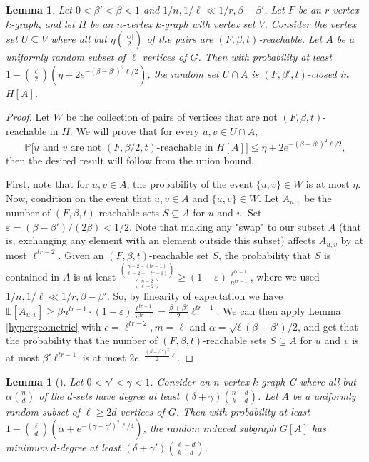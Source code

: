 \documentclass[11pt, letterpaper]{amsart}
\theoremstyle{plain}
\numberwithin{equation}{section}
\newtheorem{lemma}[thm]{Lemma}
\theoremstyle{definition}
\newcommand\card[1]{\left| #1 \right|}
\begin{document}
    
    \begin{lemma}\label{almost perfect reachability}
        Let $0<\beta'<\beta<1$ and $1/n,1/\ell\ll 1/r,\beta-\beta'$. Let $F$ be an $r$-vertex $k$-graph, and let $H$ be an $n$-vertex $k$-graph with vertex set $V$. Consider the vertex set  $U\subseteq V$ where all but $\eta\binom{\card{U}}{2}$ of the pairs are $(F,\beta,t)$-reachable.
        Let $A$ be a uniformly random subset of $\ell$ vertices of $G$. Then with probability at least $1-\binom{\ell}{2}\left(\eta+2e^{-{(\beta-\beta')}^2\ell/2}\right)$, the random set $U\cap A$ is $(F,\beta',t)$-closed in $H[A]$.
    \end{lemma}

    \begin{proof}
        Let $W$ be the collection of pairs of vertices that are not $(F,\beta,t)$-reachable in $H$. 
        We will prove that for every $u,v\in U\cap A$, 
\[\mathbb{P}\big[\text{$u$ and }v\text{ are not }(F,\beta/2,t)\text{-reachable in }H[A]\big]\le \eta+2e^{-{(\beta-\beta')}^2\ell/2},
        \] 
        then the desired result will follow from the union bound.
        
        First, note that for \(u,v\in A\), the probability of the event $\{u,v\}\in W$ is at most $\eta$. 
        Now, condition on the event that \(u,v\in A\) and \(\{u,v\}\in W\). Let $A_{u,v}$ be the number of $(F,\beta,t)$-reachable sets $S\subseteq A$ for $u$ and $v$. 
        Set $\varepsilon=(\beta-\beta')/(2\beta)<1/2$. 
        Note that making any "swap" to our subset $A$ (that is, exchanging any element with an element outside this subset) affects $A_{u,v}$ by at most ${\ell}^{tr-2}$.
        Given an $(F,\beta,t)$-reachable set $S$, the probability that $S$ is contained in $A$ is at least $\frac{\binom{n-2-(tr-1)}{\ell-2-(tr-1)}}{\binom{n-2}{\ell-2}}\ge (1-\varepsilon)\frac{{\ell}^{tr-1}}{n^{tr-1}}$, where we used $1/n,1/\ell\ll 1/r,\beta-\beta'$.
        So, by linearity of expectation we have $\mathbb{E}[A_{u,v}]\ge \beta n^{tr-1}\cdot(1-\varepsilon)\frac{{\ell}^{tr-1}}{n^{tr-1}}=\frac{\beta+\beta'}{2}{\ell}^{tr-1}$.
        We can then apply Lemma \ref{hypergeometric} with $c={\ell}^{tr-2}, m=\ell$ and $\alpha=\sqrt{\ell}(\beta-\beta')/2$, and get that the probability that the number of $(F,\beta,t)$-reachable sets $S\subseteq A$ for $u$ and $v$ is at most $\beta'{\ell}^{tr-1}$ is at most $2e^{-\frac{(\beta-\beta')^2}{2}\ell}$.
\end{proof}

    \begin{lemma}[\cite{ferber2022dirac}]\label{almost perfect codegree}
        Let $0<\gamma'<\gamma<1$. Consider an $n$-vertex $k$-graph G where all but $\alpha\binom{n}{d}$ of the $d$-sets have degree at least $(\delta+\gamma)\binom{n-d}{k-d}$. Let $A$ be a uniformly random subset of $\ell\ge 2d$ vertices of $G$. Then with probability at least $1-\binom{\ell}{d}\left(\alpha+e^{-(\gamma-\gamma')^2\ell/4}\right)$, the random induced subgraph $G[A]$ has minimum $d$-degree at least $(\delta+\gamma')\binom{\ell-d}{k-d}$.
    \end{lemma}
\end{document}
